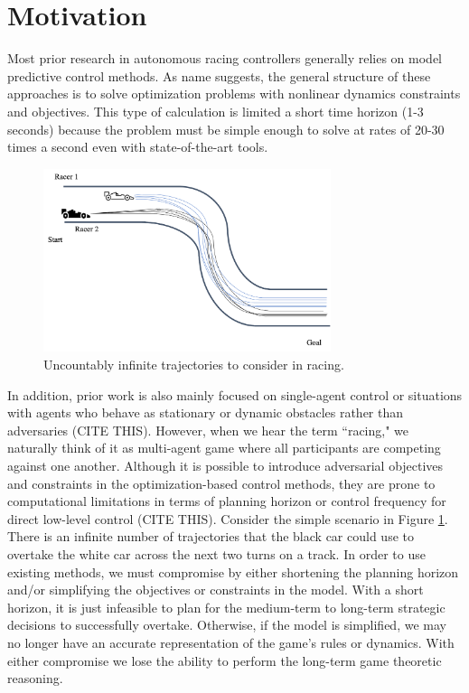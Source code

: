 \section{Motivation} %
Most prior research in autonomous racing controllers generally relies on model predictive control methods. As name suggests, the general structure of these approaches is to solve optimization problems with nonlinear dynamics constraints and objectives. This type of calculation is limited a short time horizon (1-3 seconds) because the problem must be simple enough to solve at rates of 20-30 times a second even with state-of-the-art tools. 

\begin{figure}
\begin{center}
   \includegraphics[width=0.75\textwidth]{Figures/MotivatingExampleInfTraj.png}
\caption{Uncountably infinite trajectories to consider in racing.}
\label{fig:motivating_example:inf}
\end{center}
\end{figure}

In addition, prior work is also mainly focused on single-agent control or situations with agents who behave as stationary or dynamic obstacles rather than adversaries (CITE THIS). However, when we hear the term ``racing," we naturally think of it as multi-agent game where all participants are competing against one another. Although it is possible to introduce adversarial objectives and constraints in the optimization-based control methods, they are prone to computational limitations in terms of planning horizon or control frequency for direct low-level control (CITE THIS). Consider the simple scenario in Figure \ref{fig:motivating_example:inf}. There is an infinite number of trajectories that the black car could use to overtake the white car across the next two turns on a track. In order to use existing methods, we must compromise by either shortening the planning horizon and/or simplifying the objectives or constraints in the model. With a short horizon, it is just infeasible to plan for the medium-term to long-term strategic decisions to successfully overtake. Otherwise, if the model is simplified, we may no longer have an accurate representation of the game's rules or dynamics. With either compromise we lose the ability to perform the long-term game theoretic reasoning.


